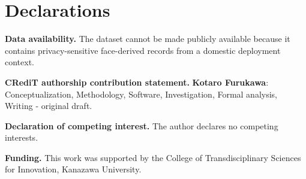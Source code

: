 \documentclass[dvipdfmx]{ehis}
\begin{document}
\section*{Declarations}
\textbf{Data availability.}
The dataset cannot be made publicly available because it contains privacy-sensitive face-derived records from a domestic deployment context.

\textbf{CRediT authorship contribution statement.}
\textbf{Kotaro Furukawa}: Conceptualization, Methodology, Software, Investigation, Formal analysis, Writing - original draft.

\textbf{Declaration of competing interest.}
The author declares no competing interests.

\textbf{Funding.}
This work was supported by the College of Transdisciplinary Sciences for Innovation, Kanazawa University.
\end{document}
